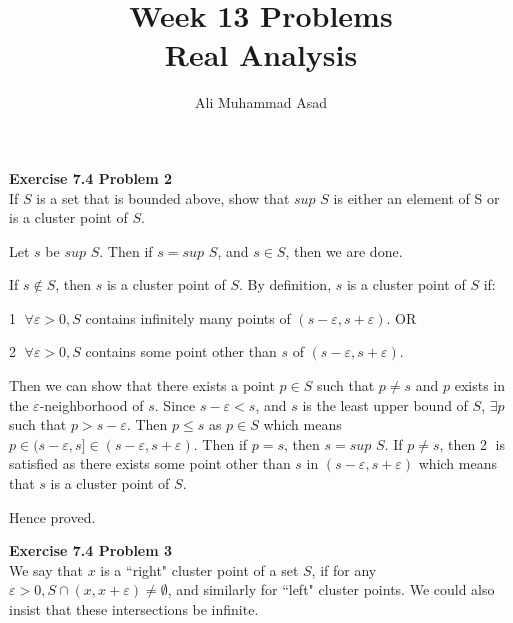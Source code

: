 \documentclass[addpoints]{exam}
\title{Week 13 Problems\\ Real Analysis}
\author{Ali Muhammad Asad}
\begin{document}
\maketitle

\begin{questions}
    \question
    \textbf{Exercise 7.4 Problem 2} \\ If $S$ is a set that is bounded above, show that $sup$ $S$ is either an element of S or is a cluster point of $S$.
    \begin{solution}
        Let $s$ be $sup$ $S$. Then if $s = sup$ $S$, and $s \in S$, then we are done.

        If $s \notin S$, then $s$ is a cluster point of $S$. By definition, $s$ is a cluster point of $S$ if:
        
        \textcircled{1} $ \forall \varepsilon > 0, S $ contains infinitely many points of $ (s-\varepsilon, s+\varepsilon) $. OR 
        
        \textcircled{2} $ \forall \varepsilon > 0, S $ contains some point other than $s$ of $ (s-\varepsilon, s+\varepsilon) $.

        Then we can show that there exists a point $p \in S$ such that $ p \neq s $ and $ p $ exists in the $\varepsilon$-neighborhood of $s$. Since $s - \varepsilon < s$, and $s$ is the least upper bound of $S$, $\exists p$ such that $p > s - \varepsilon$. Then $ p \leq s $ as $p \in S$ which means $p \in (s - \varepsilon, s] \in (s-\varepsilon, s+\varepsilon) $. Then if $p = s$, then $s = sup$ $S$. If $p \neq s$, then \textcircled{2} is satisfied as there exists some point other than $s$ in $ (s-\varepsilon, s+\varepsilon) $ which means that $s$ is a cluster point of $S$. 
        
        Hence proved.


    \end{solution}

    \question
    \textbf{Exercise 7.4 Problem 3} \\ We say that $x$ is a ``right" cluster point of a set $S$, if for any $ \varepsilon > 0, S \cap (x, x + \varepsilon) \neq \emptyset $, and similarly for ``left" cluster points. We could also insist that these intersections be infinite.
    \begin{parts}

\end{parts}
\end{questions}
\end{document}

